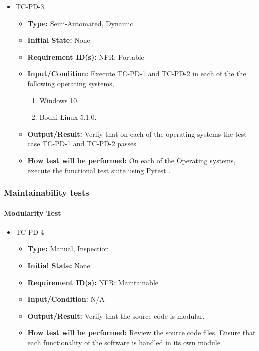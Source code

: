 \documentclass[12pt, titlepage]{article}
\begin{document}
\begin{itemize}
\item{TC-PD-3\\}
\begin{itemize}

\item{\textbf{Type:}} Semi-Automated, Dynamic.
					
\item{\textbf{Initial State:}} None

\item{\textbf{Requirement ID(s):}} NFR: Portable
					
\item{\textbf{Input/Condition:}}  Execute TC-PD-1 and TC-PD-2 in each of the the following 
operating systems,

\begin{enumerate}
\item Windows 10.
\item Bodhi Linux 5.1.0. 
\end {enumerate}
					
\item{\textbf{Output/Result:}} Verify that on each of the operating systems the test 
case TC-PD-1 and TC-PD-2 passes. 

\item{\textbf{How test will be performed:}}  On each of the Operating systems,
execute the functional test suite using  Pytest \cite{Pytest}. 

\end{itemize}
\end{itemize}


\subsubsection{Maintainability tests}

\paragraph{Modularity Test}
\begin{itemize}
\item{TC-PD-4\\}
\begin{itemize}
\item{\textbf{Type:}} Manual, Inspection.
					
\item{\textbf{Initial State:}} None

\item{\textbf{Requirement ID(s):}} NFR: Maintainable
					
\item{\textbf{Input/Condition:}}  N/A
					
\item{\textbf{Output/Result:}} Verify that the source code is modular.

\item{\textbf{How test will be performed:}}  
Review the source code files. Ensure that each functionality of the software is 
handled in its own module.
\end{itemize}
\end{itemize}
\end{document}
